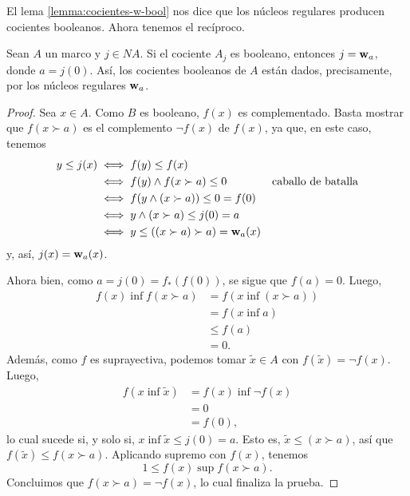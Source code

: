 El lema \ref{lemma:cocientes-w-bool} nos dice que los núcleos
regulares producen cocientes booleanos.
Ahora tenemos el recíproco.
\begin{theorem}
  Sean $A$ un marco y $j\in NA$.
  Si el cociente $A_j$ es booleano, entonces
  $j=\mathbf w_{a}$, donde $a=j(0)$.
  Así, los cocientes booleanos de $A$ están dados, precisamente,
  por los núcleos regulares $\mathbf w_{a}$.
\end{theorem}
\begin{proof}
    Sea $x\in A$. Como $B$ es booleano, $f(x)$ es complementado.
    Basta mostrar que $f(x\succ a)$ es el complemento $\neg f(x)$
    de $f(x)$, ya que, en este caso, tenemos
    \begin{align*}
        y\leq j(x)
        &\iff f(y) \leq f(x) \\
        &\iff f(y) \wedge f(x\succ a) \leq 0
            & \text{caballo de batalla} \\
        &\iff f(y\wedge(x\succ a)) \leq 0 = f(0) \\
        &\iff y\wedge(x\succ a) \leq j(0) = a \\
        &\iff y\leq ((x\succ a)\succ a) = \mathbf w_{a}(x)
    \end{align*}
    y, así, $j(x)=\mathbf w_{a}(x)$.
    
    Ahora bien, como $a=j(0)=f_*(f(0))$, se sigue que $f(a)=0$.
    Luego,
    \begin{align*}
        f(x)\inf f(x\succ a)
        &= f(x\inf(x\succ a)) \\
        &= f(x\inf a) \\
        &\leq f(a) \\
        &= 0.
    \end{align*}
    Además, como $f$ es suprayectiva, podemos tomar
    $\tilde x\in A$ con $f(\tilde x)=\neg f(x)$.
    Luego,
    \begin{align*}
        f(x\inf \tilde x)
        &= f(x)\inf\neg f(x) \\
        &= 0 \\
        &= f(0),
    \end{align*}
    lo cual sucede si, y solo si, $x\inf \tilde x\leq j(0)=a$.
    Esto es, $\tilde x\leq(x\succ a)$, así que
    $f(\tilde x)\leq f(x\succ a)$.
    Aplicando supremo con $f(x)$, tenemos
    \[
        1\leq f(x)\sup f(x\succ a)
    .\]
    Concluimos que $f(x\succ a)=\neg f(x)$, lo cual finaliza la prueba.
\end{proof}

